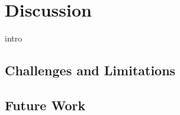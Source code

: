 \section{Discussion}
\label{sec:discussion}

intro

\subsection{Challenges and Limitations}

\subsection{Future Work}
